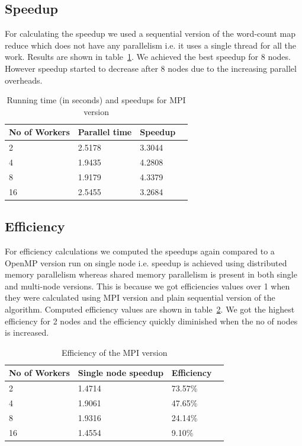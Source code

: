 \documentclass[12pt]{article}
\begin{document}
\subsection{Speedup}
For calculating the speedup we used a sequential version of the word-count map reduce which does not have any parallelism i.e. it uses a single thread for
all the work. Results are shown in table~\ref{speedup-tbl}. We achieved the best speedup for 8 nodes. However speedup started to decrease after 8 nodes due
to the increasing parallel overheads.
\begin{table}[ht]
\centering
\begin{tabular}{|l|l|l|l|}
\hline
 No of Workers & Parallel time  & Speedup \\ \hline
 2  & 2.5178 & 3.3044 \\ \hline
 4  & 1.9435 & 4.2808  \\ \hline
 8  & 1.9179 & 4.3379   \\ \hline
 16 & 2.5455 & 3.2684   \\ \hline
\end{tabular}
    \caption{Running time (in seconds) and speedups for MPI version \label{speedup-tbl}}
\end{table}
\subsection{Efficiency}
For efficiency calculations we computed the speedups again compared to a OpenMP version run on single node i.e. speedup is achieved using distributed memory 
parallelism whereas shared memory parallelism is present in both single and multi-node versions. This is because we got efficiencies values over 1 when they were calculated using MPI version and plain sequential version of the 
algorithm. Computed efficiency values are shown in table~\ref{eff-tbl}. We got the highest efficiency for 2 nodes and the efficiency quickly diminished when the 
no of nodes is increased.
\begin{table}[ht]
\centering
\begin{tabular}{|l|l|l|l|}
\hline
 No of Workers & Single node speedup  & Efficiency \\ \hline
    2  & 1.4714 & 73.57\%   \\ \hline
    4  &  1.9061 & 47.65\% \\ \hline
    8  & 1.9316 & 24.14\% \\ \hline
    16 &  1.4554 & 9.10\% \\ \hline
\end{tabular}
\caption{Efficiency of the MPI version \label{eff-tbl}}
\end{table}
\end{document}
